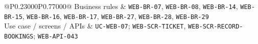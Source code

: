 \begin{longtable}{@{}P{0.23000\SRSWidth}P{0.77000\SRSWidth}@{}}
Business rules & \texttt{WEB-\allowbreak{}BR-\allowbreak{}07}, \texttt{WEB-\allowbreak{}BR-\allowbreak{}08}, \texttt{WEB-\allowbreak{}BR-\allowbreak{}14}, \texttt{WEB-\allowbreak{}BR-\allowbreak{}15}, \texttt{WEB-\allowbreak{}BR-\allowbreak{}16}, \texttt{WEB-\allowbreak{}BR-\allowbreak{}17}, \texttt{WEB-\allowbreak{}BR-\allowbreak{}27}, \texttt{WEB-\allowbreak{}BR-\allowbreak{}28}, \texttt{WEB-\allowbreak{}BR-\allowbreak{}29} \\[3pt]
Use case /\allowbreak{} screens /\allowbreak{} APIs & \texttt{UC-\allowbreak{}WEB-\allowbreak{}07}; \texttt{WEB-\allowbreak{}SCR-\allowbreak{}TICKET}, \texttt{WEB-\allowbreak{}SCR-\allowbreak{}RECORD-\allowbreak{}BOOKINGS\allowbreak{}}; \texttt{WEB-\allowbreak{}API-\allowbreak{}043} \\[3pt]
\end{longtable}
\endgroup

